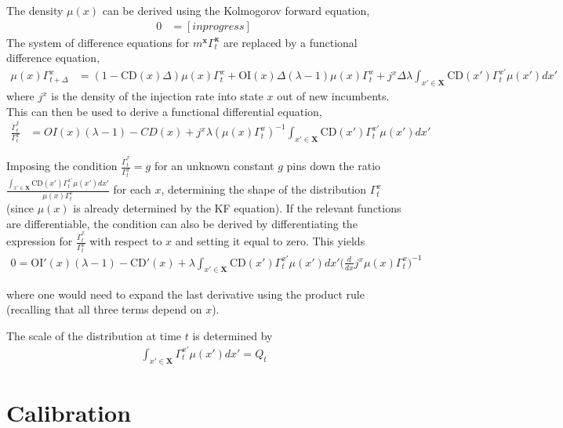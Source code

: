 \documentclass[11pt,english]{article}
\begin{document}
The density $\mu(x)$ can be derived using the Kolmogorov forward equation,
\begin{align}
0 &= [in progress]
\end{align}
The system of difference equations for $m^{\textbf{x}} \Gamma_t^{\textbf{x}}$ are replaced by a functional difference equation, 
\begin{align}
\mu(x) \Gamma_{t+\Delta}^x &= (1- \text{CD}(x) \Delta) \mu(x) \Gamma_t^x + \text{OI}(x) \Delta (\lambda -1) \mu(x) \Gamma_t^x +  j^x \Delta  \lambda \int_{x' \in \mathbf{X}} \text{CD}(x') \Gamma_t^{x'} \mu(x') dx'
\end{align}
where $j^x$ is the density of the injection rate into state $x$ out of new incumbents. This can then be used to derive a functional differential equation,
\begin{align}
\frac{\dot{\Gamma}_{t}^x}{\Gamma_t^x} &= OI(x) (\lambda -1) - CD(x) + j^x \lambda (\mu(x) \Gamma_t^x)^{-1} \int_{x' \in \mathbf{X}} \text{CD}(x') \Gamma_t^{x'} \mu(x') dx'
\end{align}

Imposing the condition $\frac{\dot{\Gamma}_{t}^x}{\Gamma_t^x} = g$ for an unknown constant $g$ pins down the ratio $\frac{\int_{x' \in \mathbf{X}} \text{CD}(x') \Gamma_t^{x'} \mu(x') dx'}{\mu(x) \Gamma_t^x}$ for each $x$, determining the shape of the distribution $\Gamma_t^x$ (since $\mu(x)$ is already determined by the KF equation). If the relevant functions are differentiable, the condition can also be derived by differentiating the expression for $\frac{\dot{\Gamma}_t^x}{\Gamma_t^x}$ with respect to $x$ and setting it equal to zero. This yields
\begin{align}
0 = \text{OI}'(x) (\lambda -1) - \text{CD}'(x) + \lambda \int_{x' \in \mathbf{X}} \text{CD}(x') \Gamma_t^{x'} \mu(x') dx' \Big(\frac{d}{dx} j^x \mu(x) \Gamma_t^x \Big)^{-1}
\end{align} 

where one would need to expand the last derivative using the product rule (recalling that all three terms depend on $x$). 

The scale of the distribution at time $t$ is determined by 
\begin{align}
\int_{x' \in \mathbf{X}} \Gamma_t^{x'} \mu(x') dx' = Q_t
\end{align}




\section{Calibration}\label{appendix:calibration}
\end{document}
